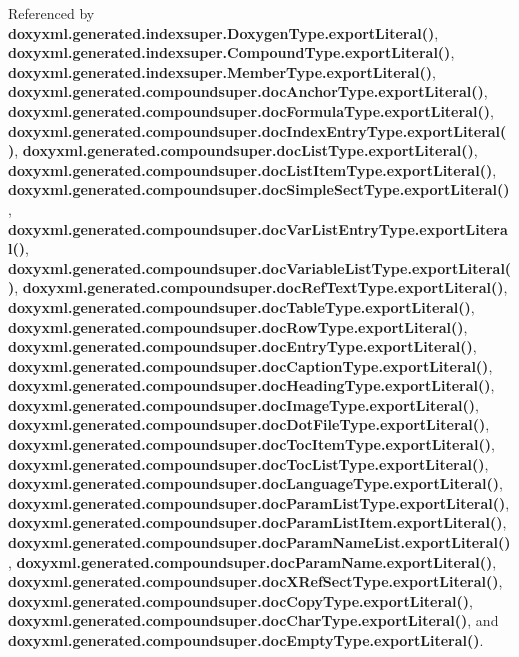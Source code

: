 Referenced by {\bf doxyxml.\+generated.\+indexsuper.\+Doxygen\+Type.\+export\+Literal()}, {\bf doxyxml.\+generated.\+indexsuper.\+Compound\+Type.\+export\+Literal()}, {\bf doxyxml.\+generated.\+indexsuper.\+Member\+Type.\+export\+Literal()}, {\bf doxyxml.\+generated.\+compoundsuper.\+doc\+Anchor\+Type.\+export\+Literal()}, {\bf doxyxml.\+generated.\+compoundsuper.\+doc\+Formula\+Type.\+export\+Literal()}, {\bf doxyxml.\+generated.\+compoundsuper.\+doc\+Index\+Entry\+Type.\+export\+Literal()}, {\bf doxyxml.\+generated.\+compoundsuper.\+doc\+List\+Type.\+export\+Literal()}, {\bf doxyxml.\+generated.\+compoundsuper.\+doc\+List\+Item\+Type.\+export\+Literal()}, {\bf doxyxml.\+generated.\+compoundsuper.\+doc\+Simple\+Sect\+Type.\+export\+Literal()}, {\bf doxyxml.\+generated.\+compoundsuper.\+doc\+Var\+List\+Entry\+Type.\+export\+Literal()}, {\bf doxyxml.\+generated.\+compoundsuper.\+doc\+Variable\+List\+Type.\+export\+Literal()}, {\bf doxyxml.\+generated.\+compoundsuper.\+doc\+Ref\+Text\+Type.\+export\+Literal()}, {\bf doxyxml.\+generated.\+compoundsuper.\+doc\+Table\+Type.\+export\+Literal()}, {\bf doxyxml.\+generated.\+compoundsuper.\+doc\+Row\+Type.\+export\+Literal()}, {\bf doxyxml.\+generated.\+compoundsuper.\+doc\+Entry\+Type.\+export\+Literal()}, {\bf doxyxml.\+generated.\+compoundsuper.\+doc\+Caption\+Type.\+export\+Literal()}, {\bf doxyxml.\+generated.\+compoundsuper.\+doc\+Heading\+Type.\+export\+Literal()}, {\bf doxyxml.\+generated.\+compoundsuper.\+doc\+Image\+Type.\+export\+Literal()}, {\bf doxyxml.\+generated.\+compoundsuper.\+doc\+Dot\+File\+Type.\+export\+Literal()}, {\bf doxyxml.\+generated.\+compoundsuper.\+doc\+Toc\+Item\+Type.\+export\+Literal()}, {\bf doxyxml.\+generated.\+compoundsuper.\+doc\+Toc\+List\+Type.\+export\+Literal()}, {\bf doxyxml.\+generated.\+compoundsuper.\+doc\+Language\+Type.\+export\+Literal()}, {\bf doxyxml.\+generated.\+compoundsuper.\+doc\+Param\+List\+Type.\+export\+Literal()}, {\bf doxyxml.\+generated.\+compoundsuper.\+doc\+Param\+List\+Item.\+export\+Literal()}, {\bf doxyxml.\+generated.\+compoundsuper.\+doc\+Param\+Name\+List.\+export\+Literal()}, {\bf doxyxml.\+generated.\+compoundsuper.\+doc\+Param\+Name.\+export\+Literal()}, {\bf doxyxml.\+generated.\+compoundsuper.\+doc\+X\+Ref\+Sect\+Type.\+export\+Literal()}, {\bf doxyxml.\+generated.\+compoundsuper.\+doc\+Copy\+Type.\+export\+Literal()}, {\bf doxyxml.\+generated.\+compoundsuper.\+doc\+Char\+Type.\+export\+Literal()}, and {\bf doxyxml.\+generated.\+compoundsuper.\+doc\+Empty\+Type.\+export\+Literal()}.




